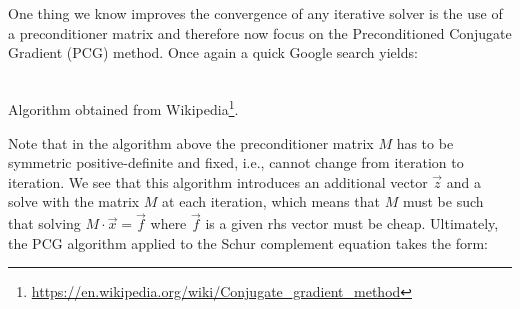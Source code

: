 One thing we know improves the convergence of any iterative solver is the use of a 
preconditioner matrix and therefore now focus on the Preconditioned Conjugate Gradient (PCG) method.
Once again a quick Google search yields:
\begin{center}
\\
Algorithm obtained from Wikipedia\footnote{\url{https://en.wikipedia.org/wiki/Conjugate\_gradient\_method}}.
\end{center}

Note that in the algorithm above the preconditioner matrix $M$ 
has to be symmetric positive-definite and fixed, i.e., cannot change from iteration to iteration. 
We see that this algorithm introduces an additional vector $\vec{z}$ and a solve with the 
matrix $M$ at each iteration, which means that $M$ must be such that solving $M\cdot \vec{x}= \vec{f}$ 
where $\vec{f}$ is a given rhs vector must be cheap. Ultimately, the PCG algorithm applied to 
the Schur complement equation takes the form:

